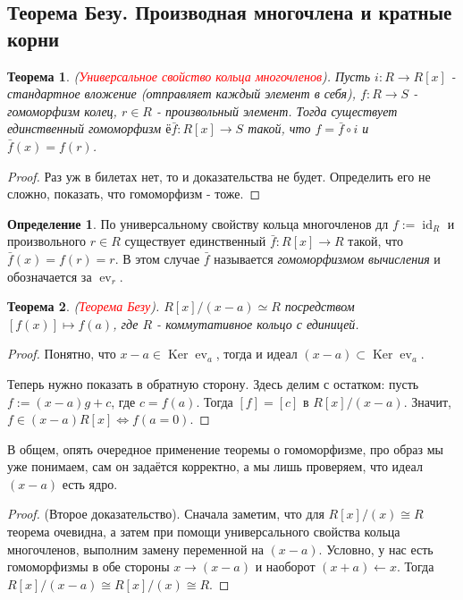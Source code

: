 \documentclass[a4paper,100pt]{article}
\theoremstyle{indented}
\newtheorem{theorem}{Теорема}
\theoremstyle{definition}
\newtheorem{defn}{Определение}
\theoremstyle{remark}
\DeclareMathOperator{\Ker}{Ker}
\DeclareMathOperator{\id}{id}
\DeclareMathOperator{\ev}{ev}
\begin{document}
\resetall

\subsection{Теорема Безу. Производная многочлена и кратные корни}

\begin{theorem}
    (\hypertarget{n33}{\textcolor{red}{\textit{Универсальное свойство кольца многочленов}}}). Пусть $i:R\rightarrow R[x]$ - стандартное вложение (отправляет каждый элемент в себя), $f:R\rightarrow S$ - гомоморфизм колец, $r\in R$ - произвольный элемент. Тогда существует единственный гомоморфизм $ё\bar{f}: R[x]\rightarrow S$ такой, что $f=\bar{f}\circ i$ и $\bar{f}(x)=f(r)$.
\end{theorem}

\begin{proof}
    Раз уж в билетах нет, то и доказательства не будет. Определить его не сложно, показать, что гомоморфизм - тоже.
\end{proof}

\begin{defn}
    По универсальному свойству кольца многочленов дл $f:=\id _R$ и произвольного $r\in R$ существует единственный $\bar{f}:R[x]\rightarrow R$ такой, что $\bar{f}(x)=f(r)=r$. В этом случае $\bar{f}$ называется \textit{гомоморфизмом вычисления} и обозначается за $\ev_r$.
\end{defn}

\begin{theorem}
    (\hypertarget{n34}{\textcolor{red}{\textit{Теорема Безу}}}). $R[x]/(x-a)\simeq R$ посредством $[f(x)]\mapsto f(a)$, где $R$ - коммутативное кольцо с единицей.
\end{theorem}

\begin{proof}
    Понятно, что $x-a\in\Ker \ev_a$, тогда и идеал $(x-a)\subset \Ker \ev_a$.\ 

    Теперь нужно показать в обратную сторону. Здесь делим с остатком: пусть $f:=(x-a)g+c$, где $c=f(a)$. Тогда $[f]=[c]$ в $R[x]/(x-a)$. Значит, $f\in (x-a)R[x]\Leftrightarrow f(a=0)$.
\end{proof}

В общем, опять очередное применение теоремы о гомоморфизме, про образ мы уже понимаем, сам он задаётся корректно, а мы лишь проверяем, что идеал $(x-a)$ есть ядро.\

\begin{proof}
    (Второе доказательство). Сначала заметим, что для $R[x]/(x)\cong R$ теорема очевидна, а затем при помощи универсального свойства кольца многочленов, выполним замену переменной на $(x-a)$. Условно, у нас есть гомоморфизмы в обе стороны $x\rightarrow (x-a)$ и наоборот $(x+a)\leftarrow x$. Тогда $R[x]/(x-a)\cong R[x]/(x)\cong R$.
\end{proof}
\end{document}
